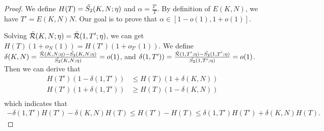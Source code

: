 \begin{proof}
We define $H(T) = \Tilde{S_2}(K,N;\eta)$ and $\alpha = \frac{T'}{T}$. By definition of $E(K, N)$, we have $T' = E(K, N)N$. Our goal is to prove that $\alpha \in [1-o(1), 1+o(1)]$.

Solving $\Bar{\mathcal{R}}(K,N;\eta)
=\Bar{\mathcal{R}}(1,T';\eta)$, we can get $H(T)(1+o_N(1)) = H(T')(1+o_{T'}(1))$. 
We define $\delta(K,N) = \frac{\Bar{\mathcal{R}}(K,N;\eta)-\Tilde{S_2}(K,N;\eta)}{\Tilde{S_2}(K,N;\eta)} = o(1)$, and $\delta(1,T')) = \frac{\Bar{\mathcal{R}}(1,T';\eta)-\Tilde{S_2}(1,T';\eta)}{\Tilde{S_2}(1,T';\eta)} = o(1)$. Then we can derive that 
\begin{align*}
    H(T')(1-\delta(1,T'))&\leq H(T)(1+\delta(K,N)) \\
    H(T')(1+\delta(1,T'))&\geq H(T)(1-\delta(K,N)) \\
\end{align*}
which indicates that
\begin{align*}
    -\delta(1,T')H(T')-\delta(K,N)H(T) \leq H(T')-H(T)\leq \delta(1,T')H(T')+\delta(K,N)H(T).
\end{align*}







\end{proof}
